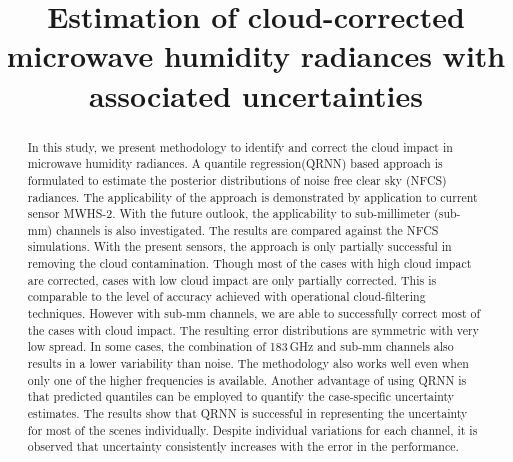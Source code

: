 \documentclass[amt, manuscript]{copernicus}
\begin{document}

\title{Estimation of cloud-corrected microwave humidity radiances with associated uncertainties}










\maketitle


\begin{abstract}

In this study, we present methodology to identify and correct the cloud impact in microwave humidity radiances. A quantile regression(QRNN) based approach is formulated to estimate the posterior distributions of noise free clear sky (NFCS) radiances. The applicability of the approach is demonstrated by application to current sensor MWHS-2. With the future outlook, the applicability to sub-millimeter (sub-mm) channels is also investigated. The results are compared against the NFCS simulations. With the present sensors, the approach is only partially successful in removing the cloud contamination. Though most of the cases with high cloud impact are corrected, cases with low cloud impact are only partially corrected. This is comparable to the level of accuracy achieved with operational cloud-filtering techniques. However with sub-mm channels, we are able to successfully correct most of the cases with cloud impact. The resulting error distributions are symmetric with very low spread. In some cases, the combination of 183\,GHz and sub-mm channels also results in a lower variability than noise. The methodology also works well even when only one of the higher frequencies is available. Another advantage of using QRNN is that predicted quantiles can be employed to quantify the case-specific uncertainty estimates. The results show that QRNN is successful in representing the uncertainty for most of the scenes individually. Despite individual variations for each channel, it is observed that uncertainty consistently increases with the error in the performance.
  

\end{abstract}
\end{document}
